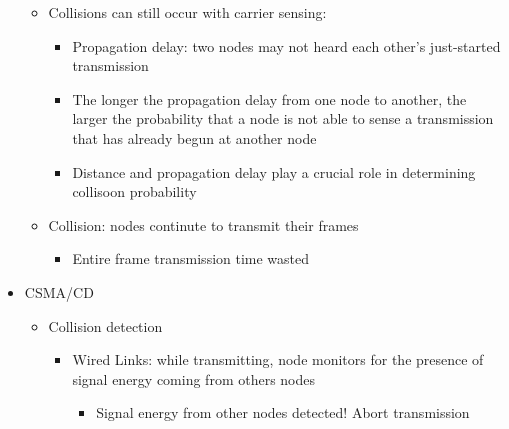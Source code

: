 \begin{itemize}
    \begin{itemize}

      \item Collisions can still occur with carrier sensing:

        \begin{itemize}

          \item Propagation delay: two nodes may not heard each other's just-started transmission

          \item The longer the propagation delay from one node to another, the larger the probability that a node is not able to sense a transmission that has already begun at another node

          \item Distance and propagation delay play a crucial role in determining collisoon probability

        \end{itemize}

      \item Collision: nodes continute to transmit their frames

        \begin{itemize}

          \item Entire frame transmission time wasted

        \end{itemize}

    \end{itemize}

  \item CSMA/CD

    \begin{itemize}

      \item Collision detection

        \begin{itemize}

          \item Wired Links: while transmitting, node monitors for the presence of signal energy coming from others nodes

            \begin{itemize}

              \item Signal energy from other nodes detected! Abort transmission

            \end{itemize}


\end{itemize}
\end{itemize}
\end{itemize}
